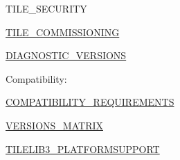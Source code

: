 \begin{DoxyItemize}
\begin{DoxyItemize}
\end{DoxyItemize}
\item T\+I\+L\+E\+\_\+\+S\+E\+C\+U\+R\+I\+TY ~\newline

\item \mbox{\hyperlink{group___t_i_l_e___c_o_m_m_i_s_s_i_o_n_i_n_g}{T\+I\+L\+E\+\_\+\+C\+O\+M\+M\+I\+S\+S\+I\+O\+N\+I\+NG}} ~\newline

\item \mbox{\hyperlink{group___d_i_a_g_n_o_s_t_i_c___v_e_r_s_i_o_n_s}{D\+I\+A\+G\+N\+O\+S\+T\+I\+C\+\_\+\+V\+E\+R\+S\+I\+O\+NS}} ~\newline

\item Compatibility\+:
\begin{DoxyItemize}
\item \mbox{\hyperlink{group___c_o_m_p_a_t_i_b_i_l_i_t_y___r_e_q_u_i_r_e_m_e_n_t_s}{C\+O\+M\+P\+A\+T\+I\+B\+I\+L\+I\+T\+Y\+\_\+\+R\+E\+Q\+U\+I\+R\+E\+M\+E\+N\+TS}}
\item \mbox{\hyperlink{group___v_e_r_s_i_o_n_s___m_a_t_r_i_x}{V\+E\+R\+S\+I\+O\+N\+S\+\_\+\+M\+A\+T\+R\+IX}}
\item \mbox{\hyperlink{group___t_i_l_e_l_i_b3___p_l_a_t_f_o_r_m_s_u_p_p_o_r_t}{T\+I\+L\+E\+L\+I\+B3\+\_\+\+P\+L\+A\+T\+F\+O\+R\+M\+S\+U\+P\+P\+O\+RT}} 
\end{DoxyItemize}
\end{DoxyItemize}